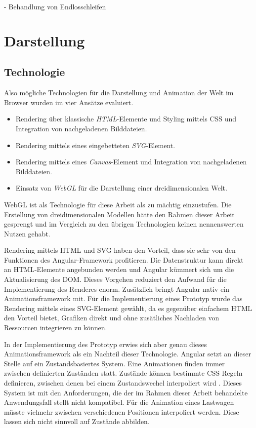 - Behandlung von Endlosschleifen

\section{Darstellung}

\subsection{Technologie}

Also mögliche Technologien für die Darstellung und Animation der Welt im Browser wurden im vier Ansätze evaluiert.

\begin{itemize}
  \item Rendering über klassische \emph{HTML}-Elemente und Styling mittels CSS und Integration von nachgeladenen Bilddateien.
  \item Rendering mittels eines eingebetteten \emph{SVG}-Element.
  \item Rendering mittels eines \emph{Canvas}-Element und Integration von nachgeladenen Bilddateien.
  \item Einsatz von \emph{WebGL} für die Darstellung einer dreidimensionalen Welt.
\end{itemize}

WebGL ist als Technologie für diese Arbeit als zu mächtig einzustufen. Die Erstellung von dreidimensionalen Modellen hätte den Rahmen dieser Arbeit gesprengt und im Vergleich zu den übrigen Technologien keinen nennenswerten Nutzen gehabt.

Rendering mittels HTML und SVG haben den Vorteil, dass sie sehr von den Funktionen des Angular-Framework profitieren. Die Datenstruktur kann direkt an HTML-Elemente angebunden werden und Angular kümmert sich um die Aktualisierung des DOM. Dieses Vorgehen reduziert den Aufwand für die Implementierung des Renderes enorm. Zusätzlich bringt Angular nativ ein Animationsframework mit. Für die Implementierung eines Prototyp wurde das Rendering mittels eines SVG-Element gewählt, da es gegenüber einfachem HTML den Vorteil bietet, Grafiken direkt und ohne zusätliches Nachladen von Ressourcen integrieren zu können.

In der Implementierung des Prototyp erwies sich aber genau dieses Animationsframework als ein Nachteil dieser Technologie. Angular setzt an dieser Stelle auf ein Zustandsbasiertes System. Eine Animationen finden immer zwischen definierten Zuständen statt. Zustände können bestimmte CSS Regeln definieren, zwischen denen bei einem Zustandswechel interpoliert wird \cite{angular-animations}. Dieses System ist mit den Anforderungen, die der im Rahmen dieser Arbeit behandelte Anwendungsfall stellt nicht kompatibel. Für die Animation eines Lastwagen müsste vielmehr zwischen verschiedenen Positionen interpoliert werden. Diese lassen sich nicht sinnvoll auf Zustände abbilden.

